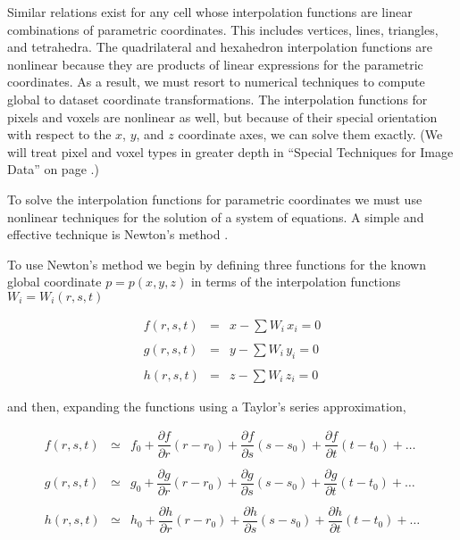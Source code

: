 Similar relations exist for any cell whose interpolation functions are linear combinations of parametric coordinates. This includes vertices, lines, triangles, and tetrahedra. The quadrilateral and hexahedron interpolation functions are nonlinear because they are products of linear expressions for the parametric coordinates. As a result, we must resort to numerical techniques to compute global to dataset coordinate transformations. The interpolation functions for pixels and voxels are nonlinear as well, but because of their special orientation with respect to the $x$, $y$, and $z$ coordinate axes, we can solve them exactly. (We will treat pixel and voxel types in greater depth in ``Special Techniques for Image Data'' on page \pageref{sec:special_techniques_for_image_data}.)

To solve the interpolation functions for parametric coordinates we must use nonlinear techniques for the solution of a system of equations. A simple and effective technique is Newton's method \cite{Conte72}.

To use Newton's method we begin by defining three functions for the known global coordinate $p = p(x,y,z)$ in terms of the interpolation functions $W_i = W_i(r,s,t)$

\begin{equation}\label{eq:8.10}
\begin{array}{lll}
f(r, s, t) &=& x - \sum W_i \, x_i = 0 \\ \\
g(r, s, t) &=& y - \sum W_i \, y_i = 0 \\ \\
h(r, s, t) &=& z - \sum W_i \, z_i = 0
\end{array}
\end{equation}

and then, expanding the functions using a Taylor's series approximation,

\begin{equation}\label{eq:8.11}
\begin{array}{lll}
f(r, s, t) &\simeq& f_0
  + \dfrac{\partial f}{\partial r}(r - r_0)
  + \dfrac{\partial f}{\partial s}(s - s_0)
  + \dfrac{\partial f}{\partial t}(t - t_0) + \ldots \\ \\
g(r, s, t) &\simeq& g_0
  + \dfrac{\partial g}{\partial r}(r - r_0)
  + \dfrac{\partial g}{\partial s}(s - s_0)
  + \dfrac{\partial g}{\partial t}(t - t_0) + \ldots \\ \\
h(r, s, t) &\simeq& h_0
  + \dfrac{\partial h}{\partial r}(r - r_0)
  + \dfrac{\partial h}{\partial s}(s - s_0)
  + \dfrac{\partial h}{\partial t}(t - t_0) + \ldots
\end{array}
\end{equation}

